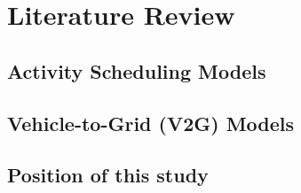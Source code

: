 \section{Literature Review}
\label{sec:literature_review}



\subsection{Activity Scheduling Models}
\label{subsec:activity_scheduling_models}

\subsection{Vehicle-to-Grid (V2G) Models}
\label{subsec:v2g_models}
  
\subsection{Position of this study}
\label{subsec:position_of_this_study}